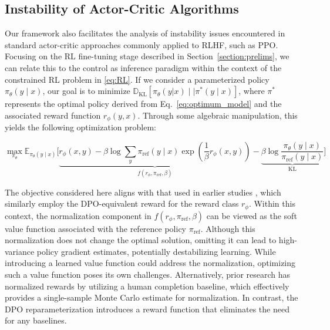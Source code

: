 \subsection{Instability of Actor-Critic Algorithms} Our framework also facilitates the analysis of instability issues encountered in standard actor-critic approaches commonly applied to RLHF, such as PPO. Focusing on the RL fine-tuning stage described in Section~\ref{section:prelims}, we can relate this to the control as inference paradigm \cite{levine2018reinforcement} within the context of the constrained RL problem in \ref{eq:RL}. If we consider a parameterized policy $\pi_{\theta}(y\mid x)$, our goal is to minimize $\mathbb{D}_{\text{KL}}[\pi_{\theta}(y|x) \mid \mid \pi^*(y\mid x)]$, where $\pi^*$ represents the optimal policy derived from Eq.~\ref{eq:optimum_model} and the associated reward function $r_{\phi}(y, x)$. Through some algebraic manipulation, this yields the following optimization problem:

\begin{equation}\label{eq:AC}
    \max_{\pi_{\theta}}\mathbb{E}_{\pi_{\theta}(y\mid x)}\bigg[\underbrace{r_{\phi}(x, y) -\beta\log\sum_{y}\pi_\text{ref}(y\mid x)\exp\left(\frac{1}{\beta}r_{\phi}(x, y)\right)}_{f(r_{\phi}, \pi_\text{ref}, \beta)} - \underbrace{\beta\log\frac{\pi_{\theta}(y\mid x)}{\pi_\text{ref}(y\mid x)}}_{\text{KL}}\bigg]
\end{equation}

The objective considered here aligns with that used in earlier studies 
\citep{ziegler2020finetuning, stiennon2022learning, bai2022training, ouyang2022training}, which similarly employ the DPO-equivalent reward for the reward class $r_{\phi}$. Within this context, the normalization component in $f(r_{\phi}, \pi_\text{ref}, \beta)$ can be viewed as the soft value function associated with the reference policy $\pi_\text{ref}$. Although this normalization does not change the optimal solution, omitting it can lead to high-variance policy gradient estimates, potentially destabilizing learning. While introducing a learned value function could address the normalization, optimizing such a value function poses its own challenges. Alternatively, prior research has normalized rewards by utilizing a human completion baseline, which effectively provides a single-sample Monte Carlo estimate for normalization. In contrast, the DPO reparameterization introduces a reward function that eliminates the need for any baselines.

